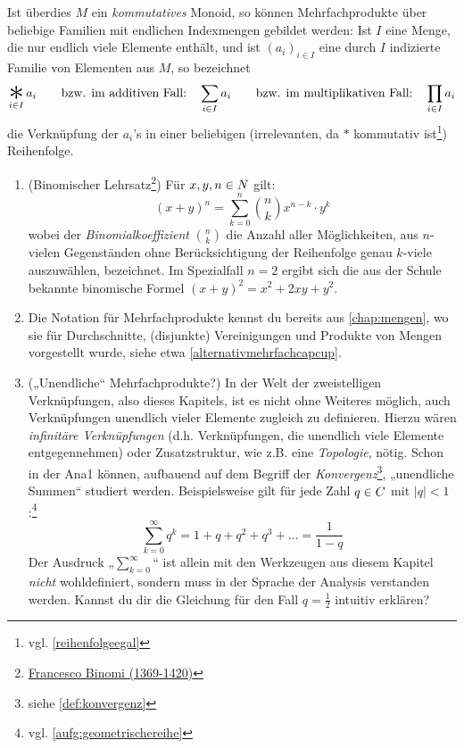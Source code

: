 \begin{nota}[Mehrfachprodukte]
    Ist überdies $M$ ein \emph{kommutatives} Monoid, so können Mehrfachprodukte über beliebige Familien mit endlichen Indexmengen gebildet werden: Ist $I$ eine Menge, die nur endlich viele Elemente enthält, und ist $(a_i)_{i\in I}$ eine durch $I$ indizierte Familie von Elementen aus $M$, so bezeichnet
        \[ \mathop{\raisebox{-0.6ex}{\scalebox{2.5}{$*$}}}_{i\in I} a_i \qquad\text{bzw. im additiven Fall:}\quad \sum_{i\in I} a_i \qquad\text{bzw. im multiplikativen Fall:}\quad \prod_{i\in I} a_i\]
    die Verknüpfung der $a_i$'s in einer beliebigen (irrelevanten, da $*$ kommutativ ist\footnote{vgl. \cref{reihenfolgeegal}}) Reihenfolge.
\end{nota}


\begin{bsp} \quad
    \begin{enumerate}
        \item(Binomischer Lehrsatz\footnote{\href{https://www.youtube.com/watch?v=462dkfAvlGo}{Francesco Binomi (1369-1420)}}) Für $x,y,n\in \relax N$ gilt:
            \[ (x+y)^n = \sum_{k=0}^n \binom{n}{k} x^{n-k}\cdot y^k \]
        wobei der \emph{Binomialkoeffizient} $\binom{n}{k}$ die Anzahl aller Möglichkeiten, aus $n$-vielen Gegenständen ohne Berücksichtigung der Reihenfolge genau $k$-viele auszuwählen, bezeichnet. Im Spezialfall $n=2$ ergibt sich die aus der Schule bekannte binomische Formel $(x+y)^2=x^2+2xy+y^2$.
        \item Die Notation für Mehrfachprodukte kennst du bereits aus \cref{chap:mengen}, wo sie für Durchschnitte, (disjunkte) Vereinigungen und Produkte von Mengen vorgestellt wurde, siehe etwa \cref{alternativmehrfachcapcup}.
        \item(„Unendliche“ Mehrfachprodukte?) In der Welt der zweistelligen Verknüpfungen, also dieses Kapitels, ist es nicht ohne Weiteres möglich, auch Verknüpfungen unendlich vieler Elemente zugleich zu definieren. Hierzu wären \emph{infinitäre Verknüpfungen} (d.h. Verknüpfungen, die unendlich viele Elemente entgegennehmen) oder Zusatzstruktur, wie z.B. eine \emph{Topologie}, nötig. Schon in der Ana1 können, aufbauend auf dem Begriff der \emph{Konvergenz}\footnote{siehe \cref{def:konvergenz}}, „unendliche Summen“ studiert werden. Beispielsweise gilt für jede Zahl $q\in \relax C$ mit $\vert q\vert < 1$:\footnote{vgl. \cref{aufg:geometrischereihe}}
            \[ \sum_{k=0}^\infty q^k = 1 + q + q^2 + q^3 + \ldots = \frac{1}{1-q} \]
        Der Ausdruck „$\sum_{k=0}^\infty$“ ist allein mit den Werkzeugen aus diesem Kapitel \emph{nicht} wohldefiniert, sondern muss in der Sprache der Analysis verstanden werden. Kannst du dir die Gleichung für den Fall $q=\frac{1}{2}$ intuitiv erklären?
    \end{enumerate}
\end{bsp}





